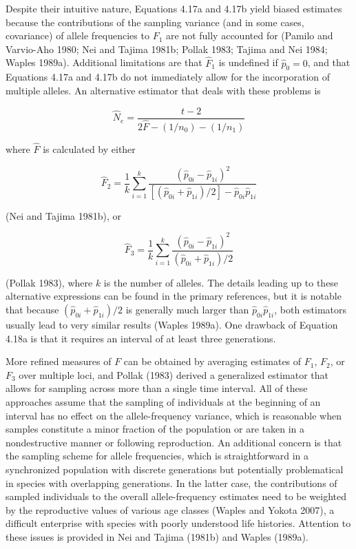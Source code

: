 \documentclass{article}
\begin{document}
Despite their intuitive nature, Equations 4.17a and 4.17b yield biased estimates because the contributions of the sampling variance (and in some cases, covariance) of allele frequencies to  $ F_1 $ are not fully accounted for (Pamilo and Varvio-Aho 1980; Nei and Tajima 1981b; Pollak 1983; Tajima and Nei 1984; Waples 1989a). Additional limitations are that  $ \widehat{F}_1 $ is undefined if  $ \widehat{p}_0 = 0 $, and that Equations 4.17a and 4.17b do not immediately allow for the incorporation of multiple alleles. An alternative estimator that deals with these problems is

\begin{equation}
\widehat{N}_{e}=\frac{t-2}{2\widehat{F}-\left(1/n_{0}\right)-\left(1/n_{1}\right)}
\tag{4.18a}
\label{eq:4_18a}
\end{equation}

where  $ \widehat{F} $ is calculated by either

\begin{equation}
\widehat{F}_{2}=\frac{1}{k}\sum_{i=1}^{k}\frac{(\widehat{p}_{0i}-\widehat{p}_{1i})^{2}}{\left[(\widehat{p}_{0i}+\widehat{p}_{1i})/2\right]-\widehat{p}_{0i}\widehat{p}_{1i}}
\tag{4.18b}
\label{eq:4_18b}
\end{equation}

(Nei and Tajima 1981b), or

\begin{equation}
\widehat{F}_{3}=\frac{1}{k}\sum_{i=1}^{k}\frac{\left(\widehat{p}_{0i}-\widehat{p}_{1i}\right)^{2}}{\left(\widehat{p}_{0i}+\widehat{p}_{1i}\right)/2}
\tag{4.18c}
\label{eq:4_18c}
\end{equation}

(Pollak 1983), where $k$ is the number of alleles. The details leading up to these alternative expressions can be found in the primary references, but it is notable that because $(\widehat{p}_{0i} + \widehat{p}_{1i}) / 2$ is generally much larger than $\widehat{p}_{0i} \widehat{p}_{1i}$, both estimators usually lead to very similar results (Waples 1989a). One drawback of Equation 4.18a is that it requires an interval of at least three generations.

More refined measures of  $ F $ can be obtained by averaging estimates of  $ F_1 $,  $ F_2 $, or  $ F_3 $ over multiple loci, and Pollak (1983) derived a generalized estimator that allows for sampling across more than a single time interval. All of these approaches assume that the sampling of individuals at the beginning of an interval has no effect on the allele-frequency variance, which is reasonable when samples constitute a minor fraction of the population or are taken in a nondestructive manner or following reproduction. An additional concern is that the sampling scheme for allele frequencies, which is straightforward in a synchronized population with discrete generations but potentially problematical in species with overlapping generations. In the latter case, the contributions of sampled individuals to the overall allele-frequency estimates need to be weighted by the reproductive values of various age classes (Waples and Yokota 2007), a difficult enterprise with species with poorly understood life histories. Attention to these issues is provided in Nei and Tajima (1981b) and Waples (1989a).
\end{document}

